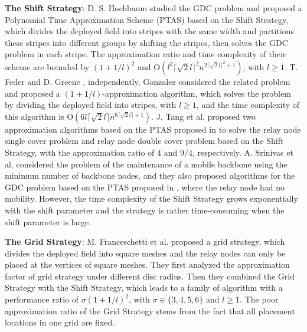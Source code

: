 \documentclass[journal]{IEEEtran}
\begin{document}
\textbf{The Shift Strategy}: D. S. Hochbaum \cite{Hochbaum85} \cite{Hochbaum97} studied the GDC problem and proposed a Polynomial Time
Approximation Scheme (PTAS) based on the Shift Strategy, which divides the deployed field into stripes with the same width and partitions
these stripes into different groups by shifting the stripes, then solves the GDC problem in each stripe. The approximation ratio and time complexity of their scheme are bounded by $(1+1/l)^2$ and O$(l^2\lceil \sqrt{2}l\rceil^2n^{2\lceil \sqrt{2}l\rceil^2+1})$, with $l\geq 1$. T. Feder and D. Greene \cite{Feder88}, independently, Gonzalez \cite{Gonzalez91} considered the
related problem and proposed a $(1+1/l)$-approximation algorithm, which solves the problem by dividing the deployed field into stripes, with $l\geq 1$, and the time complexity of this algorithm is O$(6l\lceil \sqrt{2}l\rceil n^{6\lceil \sqrt{2}l\rceil+1})$. J. Tang et al. \cite{Tang06} proposed two approximation algorithms based on the PTAS proposed in \cite{Hochbaum85} \cite{Hochbaum97} to solve the relay node single cover problem and relay node double cover problem based on the Shift Strategy, with the approximation ratio of $4$ and $9/4$, respectively. A. Srinivas et al.
\cite{Srinivas09} considered the problem of the maintenance of a mobile backbone using the minimum number of backbone nodes, and they also
proposed algorithms for the GDC problem based on the PTAS proposed in \cite{Hochbaum85} \cite{Hochbaum97}, where the relay node had no mobility. However, the time complexity of the Shift Strategy grows exponentially with the shift parameter and the strategy is rather time-consuming when the shift parameter is large.

\textbf{The Grid Strategy}: M. Franceschetti et al. \cite{Franceschetti01} \cite{Franceschetti04} proposed a grid strategy, which divides
the deployed field into square meshes and the relay nodes can only be placed at the vertices of square meshes. They first analyzed the
approximation factor of grid strategy under different disc radius. Then they combined the Grid Strategy with the Shift Strategy, which
leads to a family of algorithm with a performance ratio of $\sigma(1+1/l)^2$, with $\sigma\in\{3,4,5,6\}$ and $l\geq 1$. The poor approximation ratio of the Grid Strategy stems from the fact that all placement locations in one grid are fixed.
\end{document}
